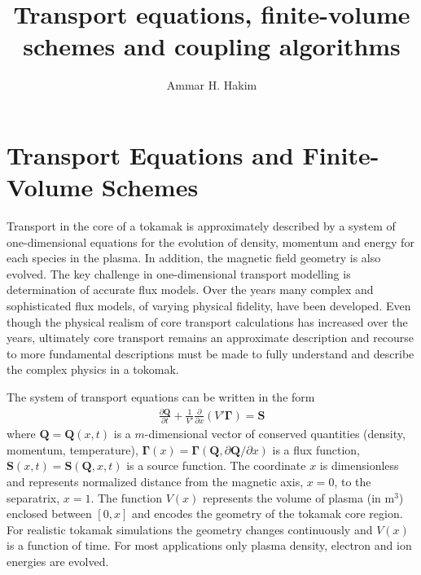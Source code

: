 \documentclass[11pt]{amsart}
\title{Transport equations, finite-volume schemes and coupling
  algorithms}%
\author{Ammar H. Hakim}%
\date{}
\newcommand{\pfrac}[2]{\frac{\partial #1}{\partial #2}}
\newcommand{\pfraca}[1]{\frac{\partial}{\partial #1}}
\newcommand{\pfracb}[2]{\partial #1/\partial #2}
\newcommand{\mvec}[1]{\mathbf{#1}}
\newcommand{\gvec}[1]{\boldsymbol{#1}}
\begin{document}
\maketitle

\section{Transport Equations and Finite-Volume Schemes}

Transport in the core of a tokamak is approximately described by a
system of one-dimensional equations for the evolution of density,
momentum and energy for each species in the plasma. In addition, the
magnetic field geometry is also evolved. The key challenge in
one-dimensional transport modelling is determination of accurate flux
models. Over the years many complex and sophisticated flux models, of
varying physical fidelity, have been developed. Even though the
physical realism of core transport calculations has increased over the
years, ultimately core transport remains an approximate description
and recourse to more fundamental descriptions must be made to fully
understand and describe the complex physics in a tokomak.

The system of transport equations can be written in the form
\begin{align}
  \pfrac{\mvec{Q}}{t} 
  + \frac{1}{V'} \pfraca{x} \left( V' \gvec{\Gamma} \right) = \mvec{S}
\end{align}
where $\mvec{Q} = \mvec{Q}(x,t)$ is a $m$-dimensional vector of
conserved quantities (density, momentum, temperature),
$\gvec{\Gamma}(x) = \gvec{\Gamma}(\mvec{Q},\pfracb{\mvec{Q}}{x})$ is a
flux function, $\mvec{S}(x,t) = \mvec{S}(\mvec{Q},x,t)$ is a source
function. The coordinate $x$ is dimensionless and represents
normalized distance from the magnetic axis, $x=0$, to the separatrix,
$x=1$. The function $V(x)$ represents the volume of plasma (in m$^3$)
enclosed between $[0,x]$ and encodes the geometry of the tokamak core
region. For realistic tokamak simulations the geometry changes
continuously and $V(x)$ is a function of time. For most applications
only plasma density, electron and ion energies are evolved.
\end{document}
